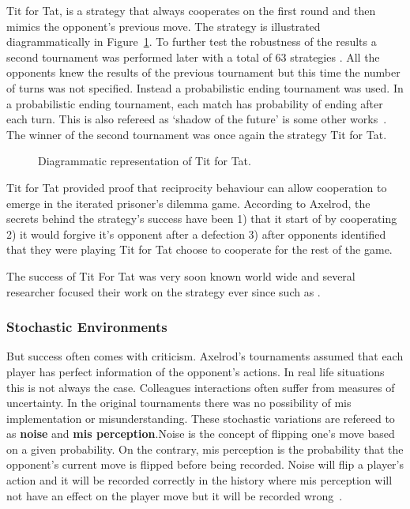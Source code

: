\documentclass{article}
\begin{document}
Tit for Tat, is a strategy that always cooperates on the first round and then
mimics the opponent's previous move. The strategy is illustrated diagrammatically
in Figure~\ref{fig:tit_for_tat_diagram}. To further test the robustness of the
results a second tournament was performed later with a total of 63 strategies
\cite{axelrod1980b}. All the opponents knew the results of the previous
tournament but this time the number of turns was not specified. Instead
a probabilistic ending tournament was used. In a probabilistic ending tournament,
each match has probability of ending after each turn. This is also refereed as
`shadow of the future' is some other works~\cite{axelrod1988}. The winner of 
the second tournament was once again the strategy Tit for Tat.

\begin{figure}[!hbtp]
    \centering
    
    \caption{Diagrammatic representation of Tit for Tat.}
    \label{fig:tit_for_tat_diagram}
\end{figure}

Tit for Tat provided proof that reciprocity behaviour can allow cooperation
to emerge in the iterated prisoner's dilemma game. According to Axelrod, the
secrets behind the strategy's success have been 1) that it start of by cooperating
2) it would forgive it's opponent after a defection 3) after opponents identified
that they were playing Tit for Tat choose to cooperate for the rest of the game.

The success of Tit For Tat was very soon  known world wide and several researcher
focused their work on the strategy ever since such as
\cite{Douglas2011, Krama2012, Milinski1987}.

\subsubsection{Stochastic Environments}

But success often comes with criticism. Axelrod's tournaments assumed that
each player has perfect information of the opponent's actions. In real life
situations this is not always the case. Colleagues interactions often suffer from
measures of uncertainty. In the original tournaments there was no possibility of
mis implementation or misunderstanding. These stochastic variations are refereed
to as \textbf{noise} and \textbf{mis perception}.Noise is the concept of flipping
one's move based on a given probability. On the contrary, mis perception is the
probability that the opponent's current move is flipped before being recorded.
Noise will flip a player's action  and it will be recorded correctly in the history
where mis perception will not have an effect on the player move but it will be
recorded wrong~\cite{Hoffmann1998}.
\end{document}
